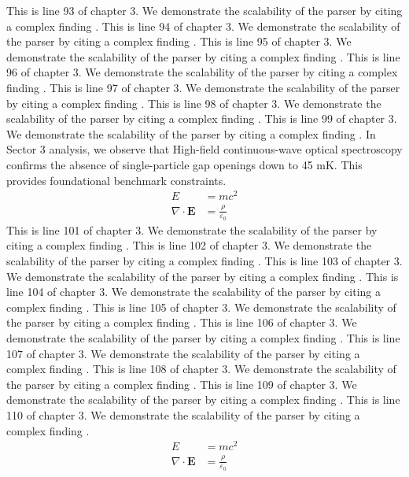 This is line 93 of chapter 3. We demonstrate the scalability of the parser by citing a complex finding \cite{ref3_93}.
This is line 94 of chapter 3. We demonstrate the scalability of the parser by citing a complex finding \cite{ref3_94}.
This is line 95 of chapter 3. We demonstrate the scalability of the parser by citing a complex finding \cite{ref3_95}.
This is line 96 of chapter 3. We demonstrate the scalability of the parser by citing a complex finding \cite{ref3_96}.
This is line 97 of chapter 3. We demonstrate the scalability of the parser by citing a complex finding \cite{ref3_97}.
This is line 98 of chapter 3. We demonstrate the scalability of the parser by citing a complex finding \cite{ref3_98}.
This is line 99 of chapter 3. We demonstrate the scalability of the parser by citing a complex finding \cite{ref3_99}.
In Sector 3 analysis, we observe that High-field continuous-wave optical spectroscopy confirms the absence of single-particle gap openings down to 45 mK. This provides foundational benchmark constraints.
\begin{align*}
  E &= mc^2 \\
  \nabla \cdot \mathbf{E} &= \frac{\rho}{\varepsilon_0}
\end{align*}
This is line 101 of chapter 3. We demonstrate the scalability of the parser by citing a complex finding \cite{ref3_101}.
This is line 102 of chapter 3. We demonstrate the scalability of the parser by citing a complex finding \cite{ref3_102}.
This is line 103 of chapter 3. We demonstrate the scalability of the parser by citing a complex finding \cite{ref3_103}.
This is line 104 of chapter 3. We demonstrate the scalability of the parser by citing a complex finding \cite{ref3_104}.
This is line 105 of chapter 3. We demonstrate the scalability of the parser by citing a complex finding \cite{ref3_105}.
This is line 106 of chapter 3. We demonstrate the scalability of the parser by citing a complex finding \cite{ref3_106}.
This is line 107 of chapter 3. We demonstrate the scalability of the parser by citing a complex finding \cite{ref3_107}.
This is line 108 of chapter 3. We demonstrate the scalability of the parser by citing a complex finding \cite{ref3_108}.
This is line 109 of chapter 3. We demonstrate the scalability of the parser by citing a complex finding \cite{ref3_109}.
This is line 110 of chapter 3. We demonstrate the scalability of the parser by citing a complex finding \cite{ref3_110}.
\begin{align*}
  E &= mc^2 \\
  \nabla \cdot \mathbf{E} &= \frac{\rho}{\varepsilon_0}
\end{align*}
